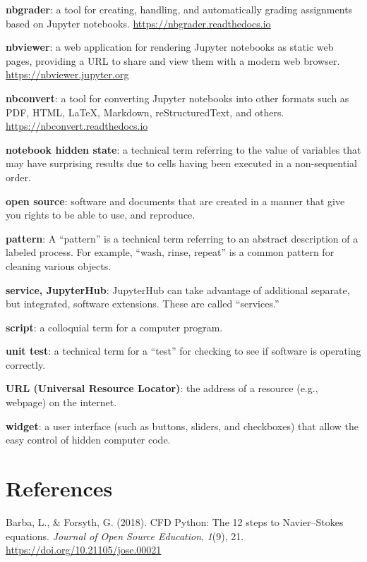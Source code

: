 \documentclass[]{book}
\begin{document}
\textbf{nbgrader}: a tool for creating, handling, and automatically
grading assignments based on Jupyter notebooks.
\url{https://nbgrader.readthedocs.io}

\textbf{nbviewer}: a web application for rendering Jupyter notebooks as
static web pages, providing a URL to share and view them with a modern
web browser. \url{https://nbviewer.jupyter.org}

\textbf{nbconvert}: a tool for converting Jupyter notebooks into other
formats such as PDF, HTML, LaTeX, Markdown, reStructuredText, and
others. \url{https://nbconvert.readthedocs.io}

\textbf{notebook hidden state}: a technical term referring to the value
of variables that may have surprising results due to cells having been
executed in a non-sequential order.

\textbf{open source}: software and documents that are created in a
manner that give you rights to be able to use, and reproduce.

\textbf{pattern}: A ``pattern'' is a technical term referring to an
abstract description of a labeled process. For example, ``wash, rinse,
repeat'' is a common pattern for cleaning various objects.

\textbf{service, JupyterHub}: JupyterHub can take advantage of
additional separate, but integrated, software extensions. These are
called ``services.''

\textbf{script}: a colloquial term for a computer program.

\textbf{unit test}: a technical term for a ``test'' for checking to see
if software is operating correctly.

\textbf{URL (Universal Resource Locator)}: the address of a resource
(e.g., webpage) on the internet.

\textbf{widget}: a user interface (such as buttons, sliders, and
checkboxes) that allow the easy control of hidden computer code.

\chapter*{References}\label{references}

\hypertarget{refs}{}
\hypertarget{ref-barbacfd}{}
Barba, L., \& Forsyth, G. (2018). CFD Python: The 12 steps to
Navier--Stokes equations. \emph{Journal of Open Source Education},
\emph{1}(9), 21. \url{https://doi.org/10.21105/jose.00021}
\end{document}

